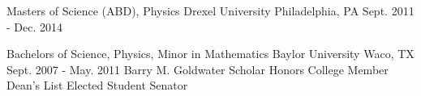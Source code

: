 

\begin{cventries}

  \cventry
    {Masters of Science (ABD), Physics} %
    {Drexel University} %
    {Philadelphia, PA} %
    {Sept. 2011 - Dec. 2014} %
    {}

  \cventry
    {Bachelors of Science, Physics, Minor in Mathematics} %
    {Baylor University} %
    {Waco, TX} %
    {Sept. 2007 - May. 2011} %
    {Barry M. Goldwater Scholar \textbullet\hspace{0.2em} Honors College Member \textbullet\hspace{0.2em} Dean's List \textbullet\hspace{0.2em} Elected Student Senator}
\end{cventries}

